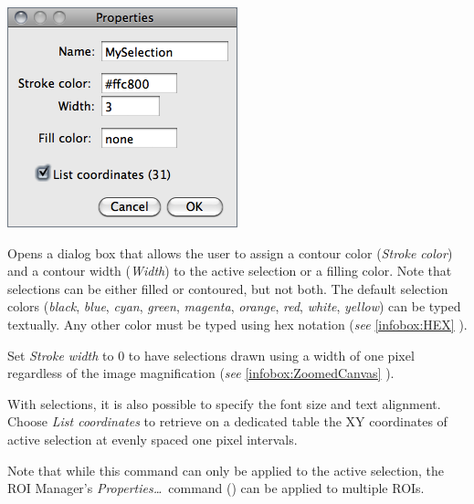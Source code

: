 \begin{minipage}[c][1\totalheight][t]{0.365\columnwidth}%
\includegraphics[scale=0.55]{images/Properties}%
\end{minipage}%
\begin{minipage}[c][1\totalheight][t]{0.635\columnwidth}%
Opens a dialog box that allows the user to assign a contour color
(\emph{Stroke color}) and a contour width (\emph{Width}) to the active
selection or a filling color. Note that selections can be either filled
or contoured, but not both. The default selection colors (\emph{black},
\emph{blue}, \emph{cyan}, \emph{green}, \emph{magenta}, \emph{orange},
\emph{red}, \emph{white}, \emph{yellow}) can be typed textually. Any
other color must be typed using hex notation (\emph{see} \ref{infobox:HEX}
).\medskip{}


Set \emph{Stroke width} to 0 to have selections drawn using a width
of one pixel regardless of the image magnification (\emph{see} \ref{infobox:ZoomedCanvas}
). %
\end{minipage}

With  selections, it is also possible to specify
the font size and text alignment. Choose \emph{List coordinates} to
retrieve on a dedicated table the XY coordinates of active selection
at evenly spaced one pixel intervals. 

Note that while this command can only be applied to the active selection,
the ROI Manager's \emph{Properties\ldots{}}\ command ()
can be applied to multiple ROIs. 




